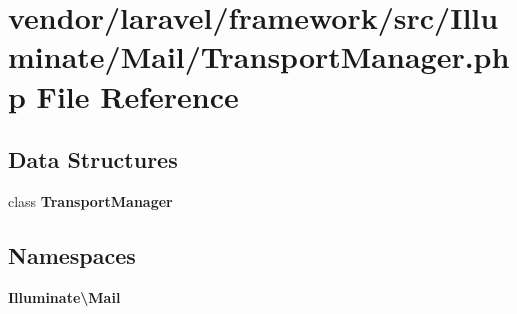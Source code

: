\section{vendor/laravel/framework/src/\+Illuminate/\+Mail/\+Transport\+Manager.php File Reference}
\label{_transport_manager_8php}
\subsection*{Data Structures}
\begin{DoxyCompactItemize}
\item 
class {\bf Transport\+Manager}
\end{DoxyCompactItemize}
\subsection*{Namespaces}
\begin{DoxyCompactItemize}
\item 
 {\bf Illuminate\textbackslash{}\+Mail}
\end{DoxyCompactItemize}
